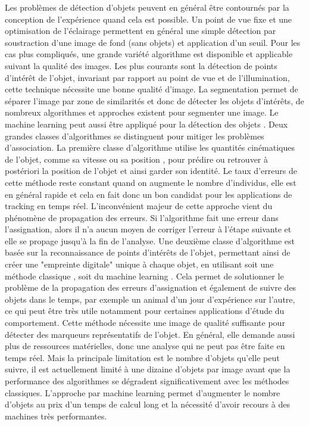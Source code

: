   Les problèmes de détection d'objets peuvent en général être contournés par la conception de l'expérience quand cela est possible. Un point de vue fixe et une optimisation de l'éclairage permettent en général une simple détection par soustraction d'une image de fond (sans objets) et application d'un seuil. Pour les cas plus compliqués, une grande variété algorithme est disponible \cite{yilmaz2006object} et applicable suivant la qualité des images. Les plus courants sont la détection de points d’intérêt de l'objet, invariant par rapport au point de vue et de l'illumination, cette technique nécessite une bonne qualité d'image. La segmentation permet de séparer l'image par zone de similarités et donc de détecter les objets d’intérêts, de nombreux algorithmes et approches existent pour segmenter une image. Le machine learning peut aussi être appliqué pour la détection des objets \cite{zhao2019object}.
\medbreak
  Deux grandes classes d’algorithmes se distinguent pour mitiger les problèmes d'association. La première classe d’algorithme utilise les quantités cinématiques de l'objet, comme sa vitesse ou sa position \cite{rodriguez2017toxid, qian2016effective}, pour prédire ou retrouver à postériori la position de l'objet et ainsi garder son identité. Le taux d'erreurs de cette méthode reste constant quand on augmente le nombre d'individus, elle est en général rapide et cela en fait donc un bon candidat pour les applications de tracking en temps réel. L’inconvénient majeur de cette approche vient du phénomène de propagation des erreurs. Si l'algorithme fait une erreur dans l'assignation, alors il n'a aucun moyen de corriger l'erreur à l'étape suivante et elle se propage jusqu'à la fin de l'analyse.
  Une deuxième classe d’algorithme est basée sur la reconnaissance de points d'intérêts de l'objet, permettant ainsi de créer une "empreinte digitale" unique à chaque objet, en utilisant soit une méthode classique \cite{perez2014idtracker, bai2018automatic}, soit du machine learning \cite{mathis2018deeplabcut, romero2019idtracker}. Cela permet de solutionner le problème de la propagation des erreurs d'assignation et également de suivre des objets dans le temps, par exemple un animal d'un jour d'expérience sur l'autre, ce qui peut être très utile notamment pour certaines applications d'étude du comportement. Cette méthode nécessite une image de qualité suffisante pour détecter des marqueurs représentatifs de l'objet. En général, elle demande aussi plus de ressources matérielles, donc une analyse qui ne peut pas être faite en temps réel. Mais la principale limitation est le nombre d'objets qu'elle peut suivre, il est actuellement limité à une dizaine d'objets par image avant que la performance  des algorithmes se dégradent significativement avec les méthodes classiques. L'approche par machine learning permet d'augmenter le nombre d'objets au prix d'un temps de calcul long et la nécessité d'avoir recours à des machines très performantes.
	
